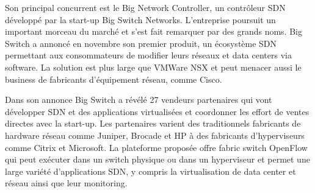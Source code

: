 Son principal concurrent est le Big Network Controller, un contrôleur SDN développé par la start-up Big Switch Networks. L'entreprise poursuit un important morceau du marché et s'est fait remarquer par des grands noms. Big Switch a annoncé en novembre son premier produit, un écosystème SDN permettant aux consommateurs de modifier leurs réseaux et data centers via software. La solution est plus large que VMWare NSX et peut menacer aussi le business de fabricants d'équipement réseau, comme Cisco. \cite{BigSwitchLaunchesFirst}


Dans son annonce Big Switch a révélé 27 vendeurs partenaires qui vont développer SDN et des applications virtualisées et coordonner les effort de ventes directes avec la start-up. Les partenaires varient des traditionnels fabricants de hardware réseau comme Juniper, Brocade et HP à des fabricants d'hyperviseurs comme Citrix et Microsoft. La plateforme proposée offre \gls{fabric} switch OpenFlow qui peut exécuter dans un switch physique ou dans un hyperviseur et permet une large variété d'applications SDN, y compris la virtualisation de data center et réseau ainsi que leur monitoring. \cite{BigSwitchAnnouncement}




